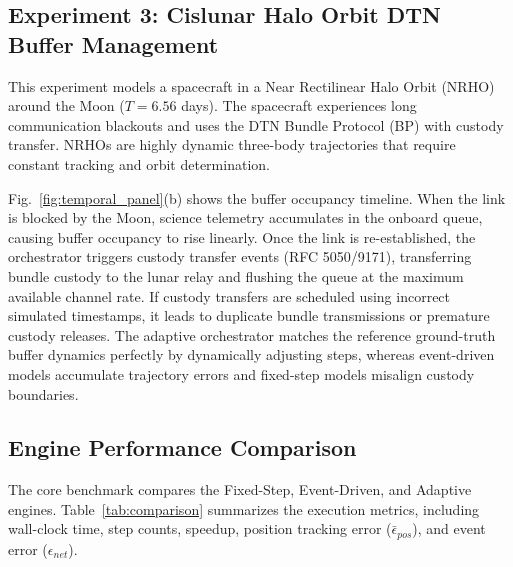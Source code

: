 \documentclass[a4paper,fleqn]{cas-sc}
\begin{document}
\subsection{Experiment 3: Cislunar Halo Orbit DTN Buffer Management}
This experiment models a spacecraft in a Near Rectilinear Halo Orbit (NRHO) around the Moon ($T = 6.56$ days). The spacecraft experiences long communication blackouts and uses the DTN Bundle Protocol (BP) with custody transfer. NRHOs are highly dynamic three-body trajectories that require constant tracking and orbit determination.

Fig.~\ref{fig:temporal_panel}(b) shows the buffer occupancy timeline. When the link is blocked by the Moon, science telemetry accumulates in the onboard queue, causing buffer occupancy to rise linearly. Once the link is re-established, the orchestrator triggers custody transfer events (RFC 5050/9171), transferring bundle custody to the lunar relay and flushing the queue at the maximum available channel rate. If custody transfers are scheduled using incorrect simulated timestamps, it leads to duplicate bundle transmissions or premature custody releases. The adaptive orchestrator matches the reference ground-truth buffer dynamics perfectly by dynamically adjusting steps, whereas event-driven models accumulate trajectory errors and fixed-step models misalign custody boundaries.

\subsection{Engine Performance Comparison}
\label{sec:comparison}
The core benchmark compares the Fixed-Step, Event-Driven, and Adaptive engines. Table~\ref{tab:comparison} summarizes the execution metrics, including wall-clock time, step counts, speedup, position tracking error ($\bar{\epsilon}_{pos}$), and event error ($\epsilon_{net}$).
\end{document}
